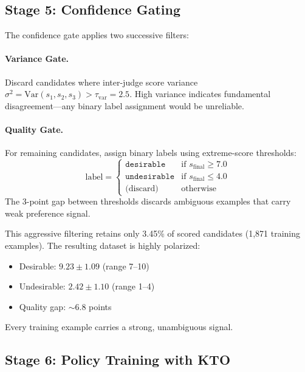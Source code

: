 \documentclass{article}
\begin{document}
\subsection{Stage 5: Confidence Gating}
\label{sec:stage5}

The confidence gate applies two successive filters:

\paragraph{Variance Gate.}
Discard candidates where inter-judge score variance $\sigma^2 = \text{Var}(s_1, s_2, s_3) > \tau_{\text{var}}{=}2.5$.
High variance indicates fundamental disagreement---any binary label assignment would be unreliable.

\paragraph{Quality Gate.}
For remaining candidates, assign binary labels using extreme-score thresholds:
\begin{equation}
  \text{label} =
  \begin{cases}
    \texttt{desirable}   & \text{if } s_{\text{final}} \geq 7.0 \\
    \texttt{undesirable} & \text{if } s_{\text{final}} \leq 4.0 \\
    \text{(discard)}     & \text{otherwise}
  \end{cases}
\end{equation}
The 3-point gap between thresholds discards ambiguous examples that carry weak preference signal.

This aggressive filtering retains only 3.45\% of scored candidates (1,871 training examples).
The resulting dataset is highly polarized:
\begin{itemize}[leftmargin=*,itemsep=0.5ex]
  \item Desirable: $9.23 \pm 1.09$ (range 7--10)
  \item Undesirable: $2.42 \pm 1.10$ (range 1--4)
  \item Quality gap: $\sim$6.8 points
\end{itemize}
Every training example carries a strong, unambiguous signal.

\subsection{Stage 6: Policy Training with KTO}
\label{sec:stage6}
\end{document}
